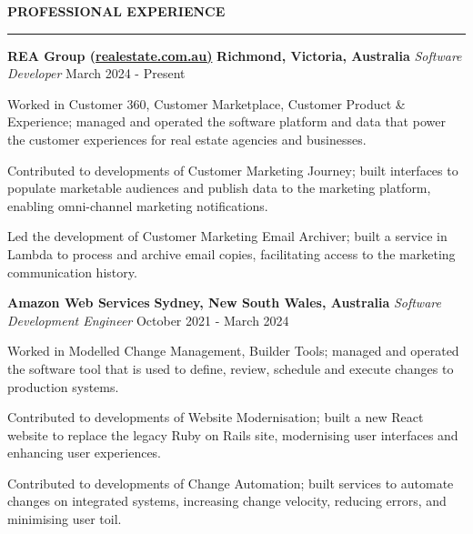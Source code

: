\documentclass{cv}
\begin{document}
\textbf{\uppercase{Professional Experience}}
\sectionlineskip
\hrule height 1.0pt
\begin{list}{}{\setlength{\leftmargin}{0pt}}
\itemsep 2.0pt
\item
    \textbf{REA Group (\href{https://realestate.com.au/}{realestate.com.au)}} \hfill \textbf{Richmond, Victoria, Australia}%
    \vspace{1.0pt} \newline 
    {\textit{Software Developer}} \hfill {March 2024 - Present}%
    \begin{list}{\raisebox{2.0pt}{\tiny$\bullet$}\space}{\setlength{\leftmargin}{11.2pt}}
        \itemsep -4.0pt \vspace{-4.0pt}
        \item Worked in Customer 360, Customer Marketplace, Customer Product \& Experience; managed and operated the software platform and data that power the customer experiences for real estate agencies and businesses.
        \item Contributed to developments of Customer Marketing Journey; built interfaces to populate marketable audiences and publish data to the marketing platform, enabling omni-channel marketing notifications.
        \item Led the development of Customer Marketing Email Archiver; built a service in Lambda to process and archive email copies, facilitating access to the marketing communication history.
    \end{list}
\item 
    \textbf{Amazon Web Services} \hfill \textbf{Sydney, New South Wales, Australia}%
    \vspace{1.0pt} \newline 
    {\textit{Software Development Engineer}} \hfill {October 2021 - March 2024}%
    \begin{list}{\raisebox{2.0pt}{\tiny$\bullet$}\space}{\setlength{\leftmargin}{11.2pt}}
        \itemsep -4.0pt \vspace{-4.0pt}
        \item Worked in Modelled Change Management, Builder Tools; managed and operated the software tool that is used to define, review, schedule and execute changes to production systems.
        \item Contributed to developments of Website Modernisation; built a new React website to replace the legacy Ruby on Rails site, modernising user interfaces and enhancing user experiences.
        \item Contributed to developments of Change Automation; built services to automate changes on integrated systems, increasing change velocity, reducing errors, and minimising user toil.

\end{list}
\end{list}
\end{document}
